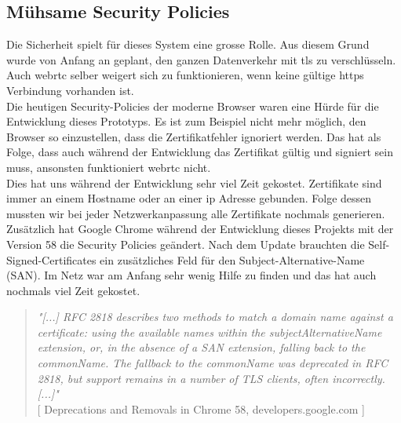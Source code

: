 \subsection{Mühsame Security Policies}
Die Sicherheit spielt für dieses System eine grosse Rolle. Aus diesem Grund wurde von Anfang an geplant, den ganzen Datenverkehr mit \gls{tls} zu verschlüsseln. Auch \gls{webrtc} selber weigert sich zu funktionieren, wenn keine gültige \gls{https} Verbindung vorhanden ist.
\\
Die heutigen Security-Policies der moderne Browser waren eine Hürde für die Entwicklung dieses Prototyps.
Es ist zum Beispiel nicht mehr möglich, den Browser so einzustellen, dass die Zertifikatfehler ignoriert werden. Das hat als Folge, dass auch während der Entwicklung das Zertifikat gültig und signiert sein muss, ansonsten funktioniert \gls{webrtc} nicht.
\\
Dies hat uns während der Entwicklung sehr viel Zeit gekostet. Zertifikate sind immer an einem Hostname oder an einer \gls{ip} Adresse gebunden. Folge dessen mussten wir bei jeder Netzwerkanpassung alle Zertifikate nochmals generieren.
\\
Zusätzlich hat Google Chrome während der Entwicklung dieses Projekts mit der
Version 58 die Security Policies geändert. \cite{ericlaw_chrome_2017} Nach dem Update brauchten die Self-Signed-Certificates ein zusätzliches Feld für den Subject-Alternative-Name (SAN). Im Netz war am Anfang sehr wenig Hilfe zu finden und das hat auch nochmals viel Zeit gekostet.


\begin{quote}
	\textit{
		"[...] RFC 2818 describes two methods to match a domain name against a certificate: using the available names within the subjectAlternativeName extension, or, in the absence of a SAN extension, falling back to the commonName. The fallback to the commonName was deprecated in RFC 2818, but support remains in a number of TLS clients, often incorrectly. [...]"
	} 
	\\
	\nocite{} [ Deprecations and Removals in Chrome 58, developers.google.com ]
\end{quote}


